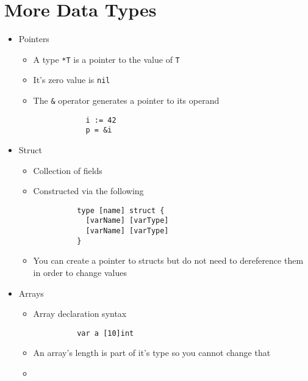 \documentclass[11pt, oneside]{article}   	%
\begin{document}
\section{More Data Types}
  \begin{itemize}
    \item Pointers
      \begin{itemize}
        \item A type \texttt{*T} is a pointer to the value of \texttt{T}
        \item It's zero value is \texttt{nil}
        \item The \texttt{\&} operator generates a pointer to its operand
          \begin{verbatim}
            i := 42
            p = &i
          \end{verbatim}
      \end{itemize}
    \item Struct
      \begin{itemize}
        \item Collection of fields
        \item Constructed via the following
          \begin{verbatim}
          type [name] struct {
            [varName] [varType]
            [varName] [varType]
          }
          \end{verbatim}
        \item You can create a pointer to structs but do not need to dereference them in order to change values
      \end{itemize}
    \item Arrays
      \begin{itemize}
        \item Array declaration syntax
          \begin{verbatim}
          var a [10]int
          \end{verbatim}
        \item An array's length is part of it's type so you cannot change that
        \item
      \end{itemize}
  \end{itemize}
\end{document}
